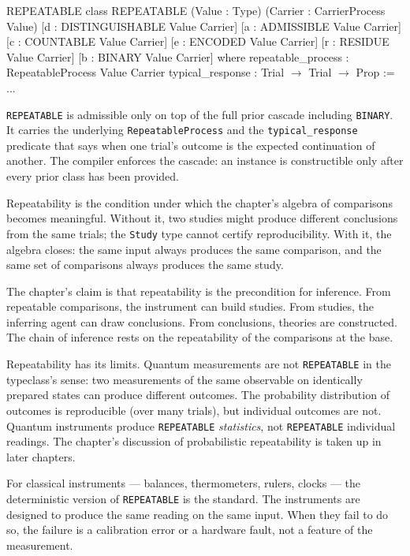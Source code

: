\begin{leanexcerpt}{REPEATABLE}
class REPEATABLE
    (Value : Type)
    (Carrier : CarrierProcess Value)
    [d : DISTINGUISHABLE Value Carrier]
    [a : ADMISSIBLE Value Carrier]
    [c : COUNTABLE Value Carrier]
    [e : ENCODED Value Carrier]
    [r : RESIDUE Value Carrier]
    [b : BINARY Value Carrier]
  where
  repeatable_process : RepeatableProcess Value Carrier
  typical_response   : Trial $\to$ Trial $\to$ Prop := ...
\end{leanexcerpt}

\texttt{REPEATABLE} is admissible only on top of the full prior cascade
including \texttt{BINARY}. It carries the underlying
\texttt{RepeatableProcess} and the \texttt{typical\_response} predicate
that says when one trial's outcome is the expected continuation of
another. The compiler enforces the cascade: an instance is constructible
only after every prior class has been provided.

Repeatability is the condition under which the chapter's algebra of
comparisons becomes meaningful. Without it, two studies might
produce different conclusions from the same trials; the
\texttt{Study} type cannot certify reproducibility. With it, the
algebra closes: the same input always produces the same comparison,
and the same set of comparisons always produces the same study.

The chapter's claim is that repeatability is the precondition for
inference. From repeatable comparisons, the instrument can build
studies. From studies, the inferring agent can draw conclusions.
From conclusions, theories are constructed. The chain of
inference rests on the repeatability of the comparisons at the
base.

Repeatability has its limits. Quantum measurements are not
\texttt{REPEATABLE} in the typeclass's sense: two measurements of
the same observable on identically prepared states can produce
different outcomes. The probability distribution of outcomes is
reproducible (over many trials), but individual outcomes are not.
Quantum instruments produce \texttt{REPEATABLE} \emph{statistics},
not \texttt{REPEATABLE} individual readings. The chapter's
discussion of probabilistic repeatability is taken up in later
chapters.

For classical instruments --- balances, thermometers, rulers, clocks
--- the deterministic version of \texttt{REPEATABLE} is the
standard. The instruments are designed to produce the same reading
on the same input. When they fail to do so, the failure is a
calibration error or a hardware fault, not a feature of the
measurement.

